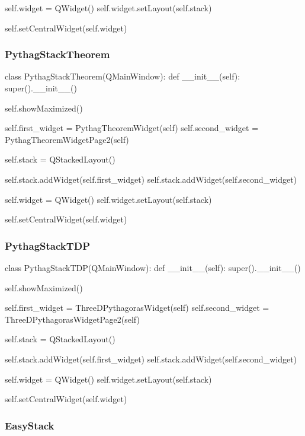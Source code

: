 \begin{landscape}
\begin{python}
        self.widget = QWidget()
        self.widget.setLayout(self.stack)

        self.setCentralWidget(self.widget)
\end{python}

\subsubsection{PythagStackTheorem}

\begin{python}
class PythagStackTheorem(QMainWindow):
    def __init__(self):
        super().__init__()

        self.showMaximized()
        
        self.first_widget = PythagTheoremWidget(self)
        self.second_widget = PythagTheoremWidgetPage2(self)

        self.stack = QStackedLayout()

        self.stack.addWidget(self.first_widget)
        self.stack.addWidget(self.second_widget)

        self.widget = QWidget()
        self.widget.setLayout(self.stack)

        self.setCentralWidget(self.widget)
\end{python}

\subsubsection{PythagStackTDP}

\begin{python}
class PythagStackTDP(QMainWindow):
    def __init__(self):
        super().__init__()
        
        self.showMaximized()
        
        self.first_widget = ThreeDPythagorasWidget(self)
        self.second_widget = ThreeDPythagorasWidgetPage2(self)

        self.stack = QStackedLayout()

        self.stack.addWidget(self.first_widget)
        self.stack.addWidget(self.second_widget)

        self.widget = QWidget()
        self.widget.setLayout(self.stack)

        self.setCentralWidget(self.widget)
\end{python}

\subsubsection{EasyStack}


\end{landscape}
